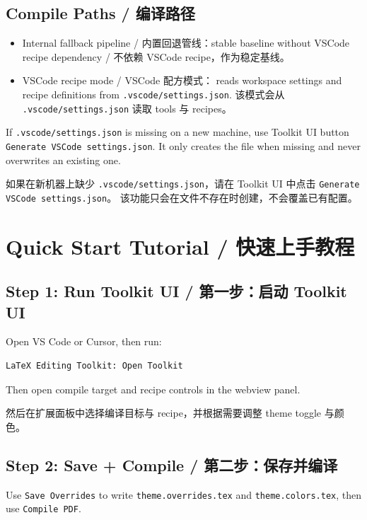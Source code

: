\documentclass[oneside]{book}
\begin{document}
\section{Compile Paths / 编译路径}

\begin{itemize}
    \item Internal fallback pipeline / 内置回退管线：stable baseline without VSCode recipe dependency / 不依赖 VSCode recipe，作为稳定基线。
    \item VSCode recipe mode / VSCode 配方模式：
    reads workspace settings and recipe definitions from \texttt{.vscode/settings.json}.
    该模式会从 \texttt{.vscode/settings.json} 读取 tools 与 recipes。
\end{itemize}

If \texttt{.vscode/settings.json} is missing on a new machine,
use Toolkit UI button \texttt{Generate VSCode settings.json}.
It only creates the file when missing and never overwrites an existing one.

如果在新机器上缺少 \texttt{.vscode/settings.json}，请在 Toolkit UI 中点击
\texttt{Generate VSCode settings.json}。
该功能只会在文件不存在时创建，不会覆盖已有配置。

\chapter{Quick Start Tutorial / 快速上手教程}

\section{Step 1: Run Toolkit UI / 第一步：启动 Toolkit UI}

Open VS Code or Cursor, then run:

\begin{verbatim}
LaTeX Editing Toolkit: Open Toolkit
\end{verbatim}

Then open compile target and recipe controls in the webview panel.

然后在扩展面板中选择编译目标与 recipe，并根据需要调整 theme toggle 与颜色。

\section{Step 2: Save + Compile / 第二步：保存并编译}

Use \texttt{Save Overrides} to write
\texttt{theme.overrides.tex} and \texttt{theme.colors.tex},
then use \texttt{Compile PDF}.
\end{document}
